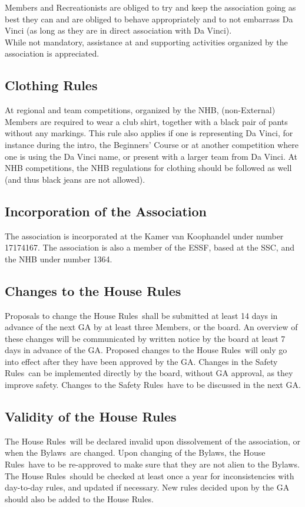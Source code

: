 \documentclass[a4paper]{article}
\newcommand{\Asta}{Bylaws} %
\newcommand{\Ahr}{House Rules} %
\newcommand{\Asr}{Safety Rules} %
\begin{document}
Members and Recreationists are obliged to try and keep the association going as best they can and are obliged to behave appropriately and to not embarrass Da Vinci (as long as they are in direct association with Da Vinci). \\

While not mandatory, assistance at and supporting activities organized by the association is appreciated.

\subsection{Clothing Rules}
\label{section:clubclothing}
At regional and team competitions, organized by the NHB, (non-External) Members are required to wear a club shirt, together with a black pair of pants without any markings. This rule also applies if one is representing Da Vinci, for instance during the intro, the Beginners' Course or at another competition where one is using the Da Vinci name, or present with a larger team from Da Vinci. At NHB competitions, the NHB regulations for clothing should be followed as well (and thus black jeans are not allowed).

\subsection{Incorporation of the Association}
The association is incorporated at the Kamer van Koophandel under number 17174167. The association is also a member of the ESSF, based at the SSC, and the NHB under number 1364.

\subsection{Changes to the \Ahr}
Proposals to change the \Ahr\ shall be submitted at least 14 days in advance of the next GA by at least three Members, or the board. An overview of these changes will be communicated by written notice by the board at least 7 days in advance of the GA. Proposed changes to the \Ahr\ will only go into effect after they have been approved by the GA. Changes in the \Asr\ can be implemented directly by the board, without GA approval, as they improve safety. Changes to the \Asr\ have to be discussed in the next GA.

\subsection{Validity of the \Ahr}
The \Ahr\ will be declared invalid upon dissolvement of the association, or when the \Asta\ are changed. Upon changing of the \Asta , the \Ahr\ have to be re-approved to make sure that they are not alien to the \Asta . The \Ahr\ should be checked at least once a year for inconsistencies with day-to-day rules, and updated if necessary. New rules decided upon by the GA should also be added to the \Ahr .
\end{document}

